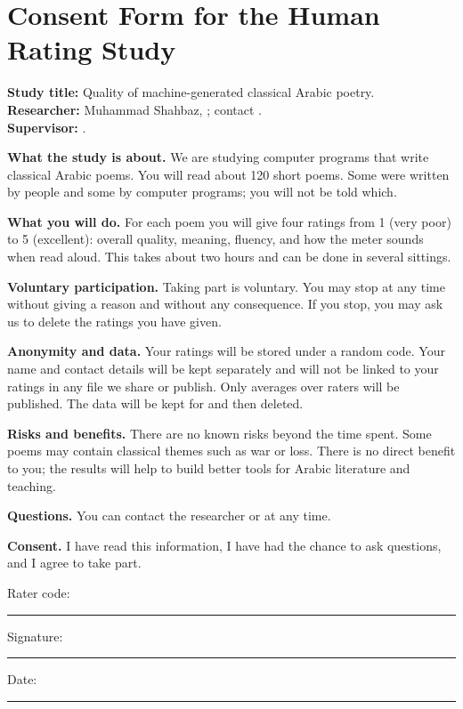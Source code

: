 \section{Consent Form for the Human Rating Study}
\label{app:consent}

\noindent\textbf{Study title:} Quality of machine-generated classical Arabic poetry.\\
\textbf{Researcher:} Muhammad Shahbaz, ; contact .\\
\textbf{Supervisor:} .

\smallskip
\noindent\textbf{What the study is about.} We are studying computer programs that write classical Arabic poems. You
will read about 120 short poems. Some were written by people and some by computer programs; you will not be told which.

\smallskip
\noindent\textbf{What you will do.} For each poem you will give four ratings from 1 (very poor) to 5 (excellent):
overall quality, meaning, fluency, and how the meter sounds when read aloud. This takes about two hours and can be done
in several sittings.

\smallskip
\noindent\textbf{Voluntary participation.} Taking part is voluntary. You may stop at any time without giving a reason
and without any consequence. If you stop, you may ask us to delete the ratings you have given.

\smallskip
\noindent\textbf{Anonymity and data.} Your ratings will be stored under a random code. Your name and contact details
will be kept separately and will not be linked to your ratings in any file we share or publish. Only averages over
raters will be published. The data will be kept for  and then deleted.

\smallskip
\noindent\textbf{Risks and benefits.} There are no known risks beyond the time spent. Some poems may contain classical
themes such as war or loss. There is no direct benefit to you; the results will help to build better tools for Arabic
literature and teaching.

\smallskip
\noindent\textbf{Questions.} You can contact the researcher or  at any time.

\smallskip
\noindent\textbf{Consent.} I have read this information, I have had the chance to ask questions, and I agree to take
part.

\smallskip
\noindent Rater code: \rule{2.5cm}{0.4pt} \quad Signature: \rule{3cm}{0.4pt} \quad Date: \rule{2cm}{0.4pt}

